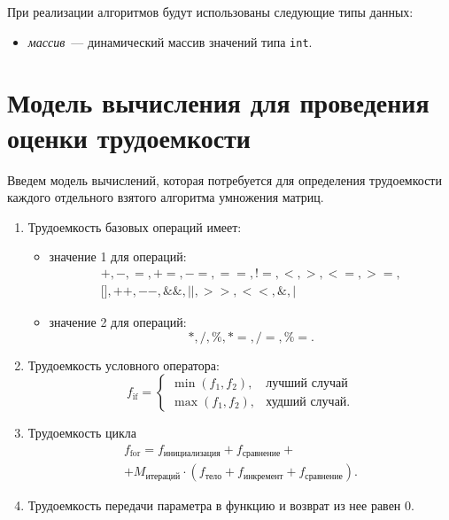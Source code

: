 При реализации алгоритмов будут использованы следующие типы данных:
\begin{itemize}
    \item \textit{массив}~--- динамический массив значений типа \texttt{int}.
\end{itemize}

\section{Модель вычисления для проведения оценки трудоемкости}

Введем модель вычислений, которая потребуется для определения трудоемкости каждого отдельного взятого алгоритма умножения матриц.
\begin{enumerate}
    \item Трудоемкость базовых операций имеет:
    \begin{itemize}
        \item значение 1 для операций:
        \begin{equation}
            \begin{gathered}
                +, -, =, +=, -=, ==, !=, <, >, <=, >=, \\ 
                \text{[]}, ++, --, \&\&, ||, >>, <<, \&, |
            \end{gathered}
        \end{equation}
        \item значение 2 для операций:
        \begin{equation}
            *, /, \%, *=, /=, \%=.
        \end{equation}
    \end{itemize}
    \item Трудоемкость условного оператора:
    \begin{equation}
        f_{\text{if}} =
        \begin{cases}
            \min({f_1, f_2}), & \text{лучший случай} \\
            \max({f_1, f_2}), & \text{худший случай}.
        \end{cases}
    \end{equation}
    \item Трудоемкость цикла
    \begin{equation}
        \begin{gathered}
            f_{\text{for}} = f_{\text{инициализация}} + f_{\text{сравнение}} + \\
            + M_{\text{итераций}} \cdot (f_{\text{тело}} + f_{\text{инкремент}} + f_{\text{сравнение}}).
        \end{gathered} 
    \end{equation}
    \item Трудоемкость передачи параметра в функцию и возврат из нее равен 0.
\end{enumerate}

